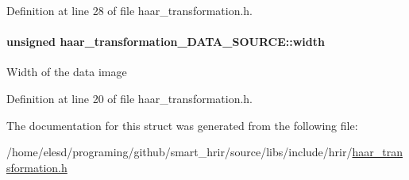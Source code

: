 Definition at line 28 of file haar\-\_\-transformation.\-h.

\hypertarget{a00001_a5a1fcebbd5511855a4fb6c0562799a62}{
\paragraph[{width}]{\setlength{\rightskip}{0pt plus 5cm}unsigned haar\-\_\-transformation\-\_\-\-D\-A\-T\-A\-\_\-\-S\-O\-U\-R\-C\-E\-::width}}\label{a00001_a5a1fcebbd5511855a4fb6c0562799a62}
Width of the data image 

Definition at line 20 of file haar\-\_\-transformation.\-h.



The documentation for this struct was generated from the following file\-:\begin{DoxyCompactItemize}
\item 
/home/elesd/programing/github/smart\-\_\-hrir/source/libs/include/hrir/\hyperlink{a00009}{haar\-\_\-transformation.\-h}\end{DoxyCompactItemize}
